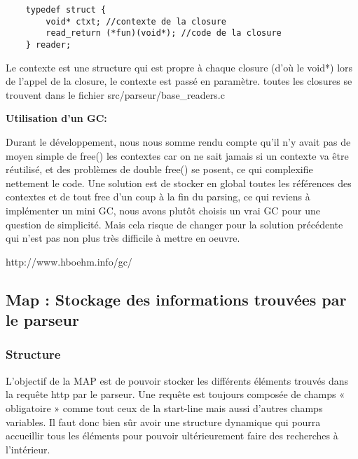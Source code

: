 \documentclass{article}
\begin{document}
            \begin{lstlisting}
    typedef struct {
        void* ctxt; //contexte de la closure
        read_return (*fun)(void*); //code de la closure
    } reader;
            \end{lstlisting}
            
            Le contexte est une structure qui est propre à chaque closure (d'où le void*)
            lors de l'appel de la closure, le contexte est passé en paramètre.
            toutes les closures se trouvent dans le fichier src/parseur/base\_readers.c
            
            \textbf{\large{Utilisation d'un GC:}}
            
            Durant le développement, nous nous somme rendu compte qu'il n'y avait pas de moyen simple de free() les contextes car on ne sait jamais si un contexte va être réutilisé, et des problèmes de double free() se posent, ce qui complexifie nettement le code. Une solution est de stocker en global toutes les références des contextes et de tout free d'un coup à la fin du parsing, ce qui reviens à implémenter un mini GC, nous avons plutôt choisis un vrai GC pour une question de simplicité. Mais cela risque de changer pour la solution précédente qui n'est pas non plus très difficile à mettre en oeuvre.
            
            http://www.hboehm.info/gc/
            
            
        
        \subsection{Map : Stockage des informations trouvées par le parseur} %
        
            \subsubsection{Structure}
            
                L’objectif de la MAP est de pouvoir stocker les différents éléments trouvés dans la requête http par le parseur. Une requête est toujours composée de champs « obligatoire » comme tout ceux de la start-line mais aussi d’autres champs variables. Il faut donc bien sûr avoir une structure dynamique qui pourra accueillir tous les éléments pour pouvoir ultérieurement faire des recherches à l’intérieur.
                
\end{document}
